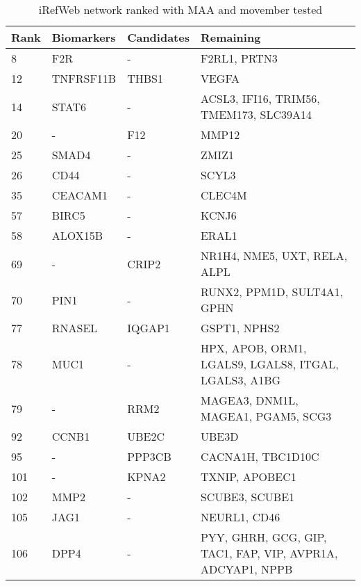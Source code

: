 \begin{table}
    \begin{tabular}{|p{1cm}|p{3cm}|p{3cm}|p{4cm}|}
        \hline
        \textbf{Rank} & \textbf{Biomarkers} & \textbf{Candidates} & \textbf{Remaining} \\
        \hline
        8	& F2R	& -	& F2RL1, PRTN3 \\
        \hline
        12	& TNFRSF11B	& THBS1	& VEGFA \\
        \hline
        14	& STAT6	& -	& ACSL3, IFI16, TRIM56, TMEM173, SLC39A14 \\
        \hline
        20	& -	& F12	& MMP12 \\
        \hline
        25	& SMAD4	& -	& ZMIZ1 \\
        \hline
        26	& CD44	& -	& SCYL3 \\
        \hline
        35	& CEACAM1	& -	& CLEC4M \\
        \hline
        57	& BIRC5	& -	& KCNJ6 \\
        \hline
        58	& ALOX15B	& -	& ERAL1 \\
        \hline
        69	& -	& CRIP2	& NR1H4, NME5, UXT, RELA, ALPL \\
        \hline
        70	& PIN1	& -	& RUNX2, PPM1D, SULT4A1, GPHN \\
        \hline
        77	& RNASEL	& IQGAP1	& GSPT1, NPHS2 \\
        \hline
        78	& MUC1	& -	& HPX, APOB, ORM1, LGALS9, LGALS8, ITGAL, LGALS3, A1BG \\
        \hline
        79	& -	& RRM2	& MAGEA3, DNM1L, MAGEA1, PGAM5, SCG3 \\
        \hline
        92	& CCNB1	& UBE2C	& UBE3D \\
        \hline
        95	& -	& PPP3CB	& CACNA1H, TBC1D10C \\
        \hline
        101	& -	& KPNA2	& TXNIP, APOBEC1 \\
        \hline
        102	& MMP2	& -	& SCUBE3, SCUBE1 \\
        \hline
        105	& JAG1	& -	& NEURL1, CD46 \\
        \hline
        106	& DPP4	& -	& PYY, GHRH, GCG, GIP, TAC1, FAP, VIP, AVPR1A, ADCYAP1, NPPB \\
        \hline
    \end{tabular}
    \caption{iRefWeb network ranked with MAA and movember tested}
    \label{tab:maa-movember}
\end{table}

